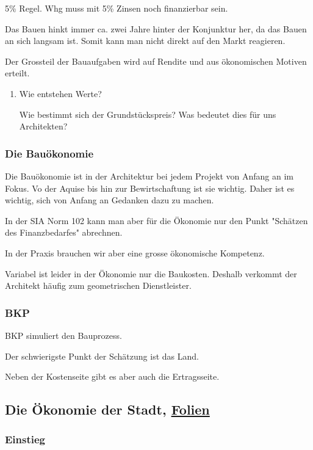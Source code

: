 \documentclass[11pt]{article}
\begin{document}
5\% Regel. Whg muss mit 5\% Zinsen noch finanzierbar sein.

Das Bauen hinkt immer ca. zwei Jahre hinter der Konjunktur her, da das Bauen
an sich langsam ist. Somit kann man nicht direkt auf den Markt reagieren.

Der Grossteil der Bauaufgaben wird auf Rendite und aus ökonomischen Motiven
erteilt.

\begin{enumerate}
\item Wie entstehen Werte?
\label{sec-2-1-1-1}

Wie bestimmt sich der Grundstückspreis? Was bedeutet dies für uns
Architekten?
\end{enumerate}

\subsubsection{Die Bauökonomie}
\label{sec-2-1-2}

Die Bauökonomie ist in der Architektur bei jedem Projekt von Anfang an im
Fokus. Vo der Aquise bis hin zur Bewirtschaftung ist sie wichtig. Daher ist
es wichtig, sich von Anfang an Gedanken dazu zu machen.

In der SIA Norm 102 kann man aber für die Ökonomie nur den Punkt "Schätzen
des Finanzbedarfes" abrechnen.

In der Praxis brauchen wir aber eine grosse ökonomische Kompetenz.

Variabel ist leider in der Ökonomie nur die Baukosten. Deshalb verkommt der
Architekt häufig zum geometrischen Dienstleister.

\subsubsection{BKP}
\label{sec-2-1-3}

BKP simuliert den Bauprozess.

Der schwierigste Punkt der Schätzung ist das Land.

Neben der Kostenseite gibt es aber auch die Ertragsseite.

\subsection{Die Ökonomie der Stadt, \href{Vorlesungsfolien/02_Die_Oekonomie_der_Stadt_V.pdf}{Folien}}
\label{sec-2-2}

\subsubsection{Einstieg}
\label{sec-2-2-1}
\end{document}
